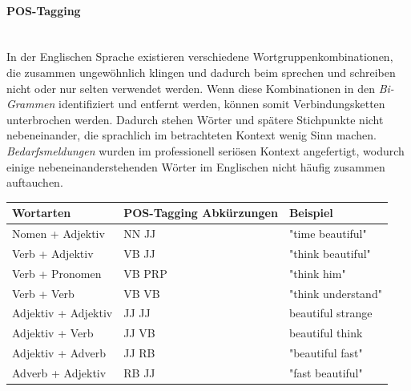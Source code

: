 \paragraph{POS-Tagging}\label{postagging} \mbox{}\\
In der Englischen Sprache existieren verschiedene Wortgruppenkombinationen, die zusammen ungewöhnlich klingen und dadurch beim sprechen und schreiben nicht oder nur selten verwendet werden. Wenn diese Kombinationen in den \emph{Bi-Grammen} identifiziert und entfernt werden, können somit Verbindungsketten unterbrochen werden. Dadurch stehen Wörter und spätere Stichpunkte nicht nebeneinander, die sprachlich im betrachteten Kontext wenig Sinn machen. \emph{Bedarfsmeldungen} wurden im professionell seriösen Kontext angefertigt, wodurch einige nebeneinanderstehenden Wörter im Englischen nicht häufig zusammen auftauchen.
\begin{center}
	\begin{tabularx}{1\textwidth} { 
			| >{\raggedright\arraybackslash}X 
			| >{\raggedright\arraybackslash}X
			| >{\raggedright\arraybackslash}X | }
		\hline
		Wortarten & POS-Tagging Abkürzungen & Beispiel \\
		\hline
		\hline
		Nomen + Adjektiv & NN JJ & "time beautiful"\\
		\hline
		Verb + Adjektiv & VB JJ & "think beautiful"\\
		\hline
		Verb + Pronomen & VB PRP & "think him"\\
		\hline
		Verb + Verb & VB VB & "think understand"\\
		\hline
		Adjektiv + Adjektiv & JJ JJ & beautiful strange\\
		\hline
		Adjektiv + Verb & JJ VB & beautiful think\\
		\hline
		Adjektiv + Adverb & JJ RB & "beautiful fast"\\
		\hline
		Adverb + Adjektiv & RB JJ & "fast beautiful"\\
		\hline
	\end{tabularx}\\
	\label{tab:wortkombinationen}
\end{center}
